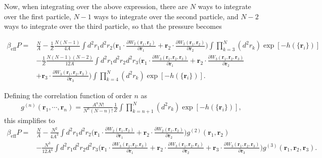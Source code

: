 \documentclass[../main.tex]{subfiles}
\begin{document}
Now, when integrating over the above expression, there are $N$ ways to
integrate over the first particle, $N-1$ ways to integrate over the
second particle, and $N-2$ ways to integrate over the third particle,
so that the pressure becomes
\begin{widetext}
  \begin{align}
    \beta_{\mathrm{eff}} P
    =& \frac{N}{A}
    -\frac{1}{Z}\frac{N(N-1)}{4A}\int d^2r_1d^2r_2\bigg(\bm{r}_1\cdot
    \frac{\partial W_2(\bm{r}_1,\bm{r}_2)}{\partial \bm{r}_1}
    +\bm{r}_2\cdot
    \frac{\partial W_2(\bm{r}_1,\bm{r}_2)}{\partial \bm{r}_2}\bigg)
    \int\prod_{k=3}^N(d^2r_k)
    \exp[-h(\{\bm{r}_i\})]\nonumber\\
    &-\frac{1}{Z}\frac{N(N-1)(N-2)}{12A}\int d^2r_1d^2r_2d^2r_3\bigg(
    \bm{r}_1\cdot
    \frac{\partial W_3(\bm{r}_1,\bm{r}_2,\bm{r}_3)}{\partial \bm{r}_1}
    +\bm{r}_2\cdot
    \frac{\partial W_3(\bm{r}_1,\bm{r}_2,\bm{r}_3)}{\partial \bm{r}_2}
    \nonumber\\
    &+\bm{r}_3\cdot
    \frac{\partial W_3(\bm{r}_1,\bm{r}_2,\bm{r}_3)}{\partial \bm{r}_3}
    \bigg)
    \int\prod_{k=4}^N(d^2r_k)
    \exp[-h(\{\bm{r}_i\})].
  \end{align}

  Defining the correlation function of order $n$ as
  \begin{align}
    g^{(n)}(\bm{r}_1,\cdots,\bm{r}_n)=\frac{A^nN!}{N^n(N-n)!}
    \frac{1}{Z}\int\prod_{k=n+1}^N(d^2r_k)
    \exp[-h(\{\bm{r}_i\})],
  \end{align}
  this simplifies to
  \begin{align}\label{appeq:p_2_and_3}
    \beta_{\mathrm{eff}} P
    =& \frac{N}{A}
    -\frac{N^2}{4A^3}\int d^2r_1d^2r_2\bigg(\bm{r}_1\cdot
    \frac{\partial W_2(\bm{r}_1,\bm{r}_2)}{\partial \bm{r}_1}
    +\bm{r}_2\cdot
    \frac{\partial W_2(\bm{r}_1,\bm{r}_2)}{\partial \bm{r}_2}\bigg)
    g^{(2)}(\bm{r}_1,\bm{r}_2)\nonumber\\
    &-\frac{N^3}{12A^4}\int d^2r_1d^2r_2d^2r_3\bigg(
    \bm{r}_1\cdot
    \frac{\partial W_3(\bm{r}_1,\bm{r}_2,\bm{r}_3)}{\partial \bm{r}_1}
    +\bm{r}_2\cdot
    \frac{\partial W_3(\bm{r}_1,\bm{r}_2,\bm{r}_3)}{\partial \bm{r}_2}
    +\bm{r}_3\cdot
    \frac{\partial W_3(\bm{r}_1,\bm{r}_2,\bm{r}_3)}{\partial \bm{r}_3}
    \bigg)g^{(3)}(\bm{r}_1,\bm{r}_2,\bm{r}_3).
  \end{align}
\end{widetext}
\end{document}
